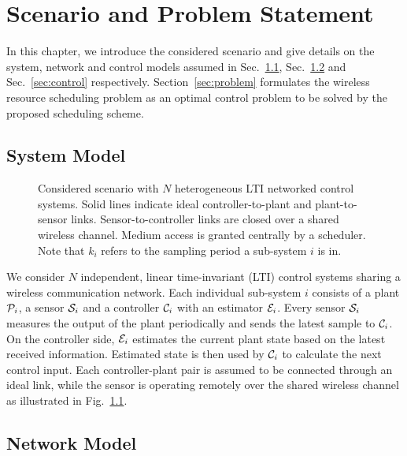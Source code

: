 \chapter{Scenario and Problem Statement}

In this chapter, we introduce the considered scenario and give details on the
system, network and control models assumed in Sec.~\ref{sec:system},
Sec.~\ref{sec:network} and Sec.~\ref{sec:control} respectively.
Section~\ref{sec:problem} formulates the wireless resource scheduling problem as
an optimal control problem to be solved by the proposed scheduling scheme.

\section{System Model} \label{sec:system} 

\begin{figure}[htb]
  \centering
  \resizebox*{.8\textwidth}{!}{} 
  \caption[Scheme of $N$ sub-systems sharing a wireless communication
  medium]{Considered scenario with $N$ heterogeneous LTI networked control
  systems. Solid lines indicate ideal controller-to-plant and plant-to-sensor
  links. Sensor-to-controller links are closed over a shared wireless channel.
  Medium access is granted centrally by a scheduler. Note that $k_i$ refers to
  the sampling period a sub-system $i$ is in.}
  \label{fig:scenario}
\end{figure}

We consider $N$ independent, linear time-invariant (LTI) control systems sharing
a wireless communication network. Each individual sub-system $i$ consists of a
plant $\mathcal{P}_i$, a sensor $\mathcal{S}_i$ and a controller $\mathcal{C}_i$ with an
estimator $\mathcal{E}_i$. Every sensor $\mathcal{S}_i$ measures the output of the plant
periodically and sends the latest sample to $\mathcal{C}_i$. On the controller
side, $\mathcal{E}_i$ estimates the current plant state based on the latest
received information. Estimated state is then used by $\mathcal{C}_i$ to calculate
the next control input. Each controller-plant pair is assumed to be connected
through an ideal link, while the sensor is operating remotely over the shared
wireless channel as illustrated in Fig.~\ref{fig:scenario}.

\section{Network Model} \label{sec:network} 

